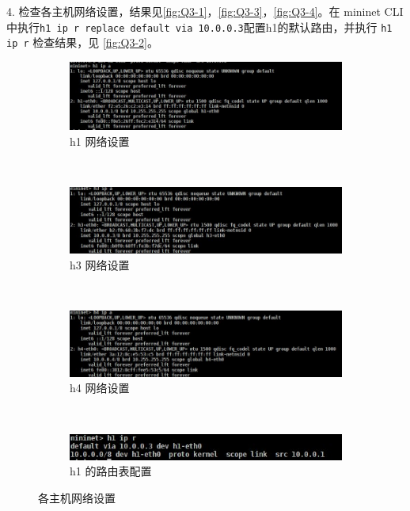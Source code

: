 \documentclass[format=draft,language=chinese,category=SDN]{hustreport}
\newcommand{\code}{\texttt}
\begin{document}
4. 检查各主机网络设置，结果见\autoref{fig:Q3-1}，\autoref{fig:Q3-3}，\autoref{fig:Q3-4}。在 mininet CLI 中执行\code{h1 ip r replace default via 10.0.0.3}配置h1的默认路由，并执行 \code{h1 ip r} 检查结果，见 \autoref{fig:Q3-2}。
\begin{figure}[!h]
\centering
  \begin{subfigure}[b]{0.48\textwidth}
  \includegraphics[width=\textwidth]{fig/3_1}
  \caption{h1 网络设置}\label{fig:Q3-1}
  \end{subfigure}
  ~
  \begin{subfigure}[b]{0.48\textwidth}
  \includegraphics[width=\textwidth]{fig/3_3}
  \caption{h3 网络设置}\label{fig:Q3-3}
  \end{subfigure}
  ~
  \begin{subfigure}[b]{0.48\textwidth}
  \includegraphics[width=\textwidth]{fig/3_4}
  \caption{h4 网络设置}\label{fig:Q3-4}
  \end{subfigure}
  ~
  \begin{subfigure}[b]{0.48\textwidth}
  \includegraphics[width=\textwidth]{fig/3_2}
  \caption{h1 的路由表配置}\label{fig:Q3-2}
  \end{subfigure}
\caption{各主机网络设置}\label{fig:Q3-S1}
\end{figure}
\end{document}
